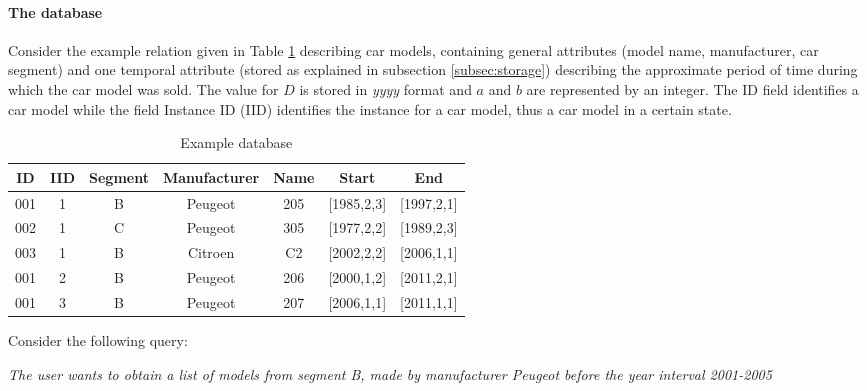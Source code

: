 \begin{example} 

\paragraph{The database}
Consider the example relation given in Table \ref{tb:car-models} describing car models, containing general attributes (model name, manufacturer, car segment) and one temporal attribute (stored as explained in subsection \ref{subsec:storage}) describing the approximate period of time during which the car model was sold. The value for $D$ is stored in \emph{yyyy} format and $a$ and $b$ are represented by an integer. The ID field identifies a car model while the field Instance ID (IID) identifies the instance for a car model, thus a car model in a certain state.
\begin{table}[h]
\centering
\caption{Example database}
\begin{tabular}{c c c c c c c}
\hline
ID & IID & Segment & Manufacturer & Name & Start & End  \\ [0.5ex]
\hline
001 & 1 & B & Peugeot & 205 & [1985,2,3] & [1997,2,1] \\
002 & 1 & C & Peugeot & 305 & [1977,2,2] & [1989,2,3] \\
003 & 1 & B & Citroen & C2 & [2002,2,2] & [2006,1,1] \\
001 & 2 & B & Peugeot & 206 & [2000,1,2] & [2011,2,1] \\
001 & 3 & B & Peugeot & 207 & [2006,1,1] & [2011,1,1]\\
\hline
\end{tabular}
\vspace{10pt}

\label{tb:car-models}

\vspace{-30pt}

\end{table}

Consider the following query:
\begin{center}
\emph{The user wants to obtain a list of models from segment B, made by manufacturer Peugeot before the year interval 2001-2005}
\end{center}


\end{example}
